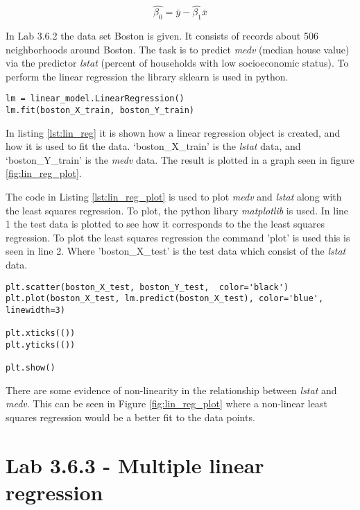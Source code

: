 \begin{equation}
\hat{\beta_0} = \bar{y} -\hat{\beta_1}\bar{x}
\end{equation}

In Lab 3.6.2 the data set Boston is given. It consists of records about 506 neighborhoods around Boston. The task is to predict \emph{medv} (median house  value) via the predictor \emph{lstat} (percent of households with low socioeconomic status).
To perform the linear regression the library sklearn is used in python. 

\lstset{}
\begin{lstlisting}[caption={Python Linear Regression function}, label=lst:lin_reg, mathescape=true]
lm = linear_model.LinearRegression()
lm.fit(boston_X_train, boston_Y_train)
\end{lstlisting}

In listing \ref{lst:lin_reg} it is shown how a linear regression object is created, and how it is used to fit the data. ‘boston\_X\_train’ is the \emph{lstat} data, and ‘boston\_Y\_train’ is the \emph{medv} data.
The result is plotted in a graph seen in figure \ref{fig:lin_reg_plot}.


The code in Listing \ref{lst:lin_reg_plot} is used to plot \emph{medv} and \emph{lstat} along with the least squares regression. To plot, the python libary \emph{matplotlib} is used. In line 1 the test data is plotted to see how it corresponds to the the least squares regression. To plot the least squares regression the command 'plot' is used this is seen in line 2. Where 'boston\_X\_test' is the test data which consist of the \emph{lstat} data. 

\begin{lstlisting}[caption={Python Plotting of Linear Regression function}, label=lst:lin_reg_plot, mathescape=true]
plt.scatter(boston_X_test, boston_Y_test,  color='black')
plt.plot(boston_X_test, lm.predict(boston_X_test), color='blue',
linewidth=3)

plt.xticks(())
plt.yticks(())

plt.show()
\end{lstlisting}

There are some evidence of non-linearity in the relationship between \emph{lstat} and \emph{medv}. This can be seen in Figure \ref{fig:lin_reg_plot} where a non-linear least squares regression would be a better fit to the data points.

\section{Lab 3.6.3 - Multiple linear regression}


